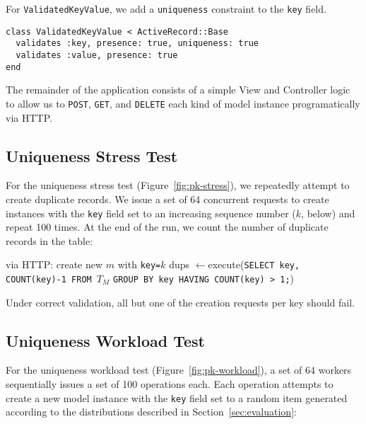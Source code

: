 For \texttt{ValidatedKeyValue}, we add a \texttt{uniqueness} constraint to the \texttt{key} field.

\begin{lstlisting}
class ValidatedKeyValue < ActiveRecord::Base
  validates :key, presence: true, uniqueness: true
  validates :value, presence: true
end
\end{lstlisting}

The remainder of the application consists of a simple View and Controller logic to allow us to \texttt{POST}, \texttt{GET}, and \texttt{DELETE} each kind of model instance programatically via HTTP.


\subsection{Uniqueness Stress Test}
\label{sec:appendix-uniqueness-stress}

For the uniqueness stress test (Figure~\ref{fig:pk-stress}), we repeatedly attempt to create duplicate records. We issue a set of 64 concurrent requests to create instances with the \texttt{key} field set to an increasing sequence number ($k$, below) and repeat 100 times. At the end of the run, we count the number of duplicate records in the table:

\begin{algorithm}[H]
\begin{algorithmic}
      \State via HTTP: create new $m$ with \texttt{key=$k$}
     \EndParFor
   \EndFor
   \State dups $\gets $execute(\texttt{SELECT key, COUNT(key)-1 FROM $T_M$}
   \State \hspace{6.5em}\texttt{GROUP BY key HAVING COUNT(key) > 1;})
\EndFor
\end{algorithmic}
\end{algorithm}

Under correct validation, all but one of the creation requests per key should fail.

\subsection{Uniqueness Workload Test}
\label{sec:appendix-uniqueness-workload}

For the uniqueness workload test (Figure~\ref{fig:pk-workload}), a set of 64 workers sequentially issues a set of 100 operations each. Each operation attempts to create a new model instance with the \texttt{key} field set to a random item generated according to the distributions described in Section~\ref{sec:evaluation}:

